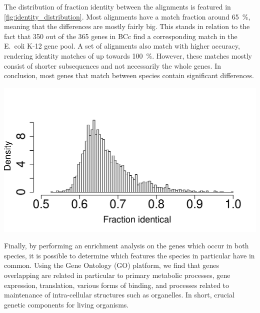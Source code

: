 \documentclass[10pt]{article}\usepackage[]{graphicx}\usepackage[]{color}
\makeatletter
\def\maxwidth{ %
  \ifdim\Gin@nat@width>\linewidth
    \linewidth
  \else
    \Gin@nat@width
  \fi
}
\newenvironment{knitrout}{}{} %
\theoremstyle{plain}
\theoremstyle{definition}
\makeatother
\begin{document}
\begin{multicols}{2}

The distribution of fraction identity between the alignments is featured in \cref{fig:identity_distribution}. Most alignments have a match fraction around 65~\%, meaning that the differences are mostly fairly big. This stands in relation to the fact that 350  out of the 365 genes in BCc find a corresponding match in the E.\ coli K-12 gene pool. A set of alignments also match with higher accuracy, rendering identity matches of up towards 100~\%. However, these matches mostly consist of shorter subsequences and not necessarily the whole genes. In conclusion, most genes that match between species contain significant differences. 
\begin{minipage}{.45\textwidth}
\begin{knitrout}
\color{fgcolor}
\includegraphics[width=\maxwidth]{figure/unnamed-chunk-4-1} 

\end{knitrout}
\label{fig:identity_distribution}
\end{minipage}
\vspace{.5em}

\pagebreak Finally, by performing an enrichment analysis on the genes which occur in both species, it is possible to determine which features the species in particular have in common. Using the Gene Ontology (GO) platform, we find that genes overlapping are related in particular to primary metabolic processes, gene expression, translation, various forms of binding, and processes related to maintenance of intra-cellular structures such as organelles. In short, crucial genetic components for living organisms. 


\end{multicols}
\end{document}
